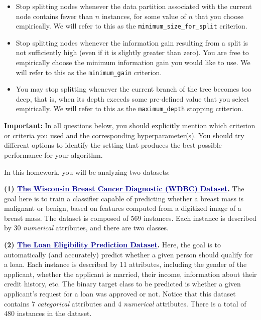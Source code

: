 \documentclass{article}
\begin{document}
\begin{itemize} 
\item Stop splitting nodes whenever the data partition associated with the current node contains fewer than $n$ instances, for some value of $n$ that you choose empirically. We will refer to this as the \texttt{minimum\_size\_for\_split} criterion.
\item Stop splitting nodes whenever the information gain resulting from a split is not sufficiently high (even if it is slightly greater than zero). You are free to empirically choose the minimum information gain you would like to use. We will refer to this as the \texttt{minimum\_gain} criterion.
\item You may stop splitting whenever the current branch of the tree becomes too deep, that is, when its depth exceeds some pre-defined value that you select empirically. We will refer to this as the \texttt{maximum\_depth} stopping criterion.
\end{itemize}
%
\begin{mybox}[boxpink] 
\textbf{Important:} In all questions below, you should explicitly mention which criterion or criteria you used and the corresponding hyperparameter(s). You should try different options to identify the setting that produces the best possible performance for your algorithm.
\end{mybox}
%





\newpage
\noindent In this homework, you will be analyzing two datasets:
\vspace{0.3cm}

\noindent \textbf{(1) \textcolor{darkblue}{\ul{The Wisconsin Breast Cancer Diagnostic (WDBC) Dataset}}.}
\noindent The goal here is to train a classifier capable of predicting whether a breast mass is malignant or benign, based on features computed from a digitized image of a breast mass. The dataset is composed of 569 instances. Each instance is described by 30 \textit{numerical} attributes, and there are two classes.
\vspace{0.5cm}

\noindent \textbf{(2) \textcolor{darkblue}{\ul{The Loan Eligibility Prediction Dataset}}.}
\noindent Here, the goal is to automatically (and accurately) predict whether a given person should qualify for a loan. Each instance is described by 11 attributes, including the gender of the applicant, whether the applicant is married, their income, information about their credit history, etc. The binary target class to be predicted is whether a given applicant's request for a loan was approved or not. Notice that this dataset contains 7 \textit{categorical} attributes and 4 \textit{numerical} attributes. There is a total of 480 instances in the dataset. 
\vspace{0.3cm}
\end{document}
